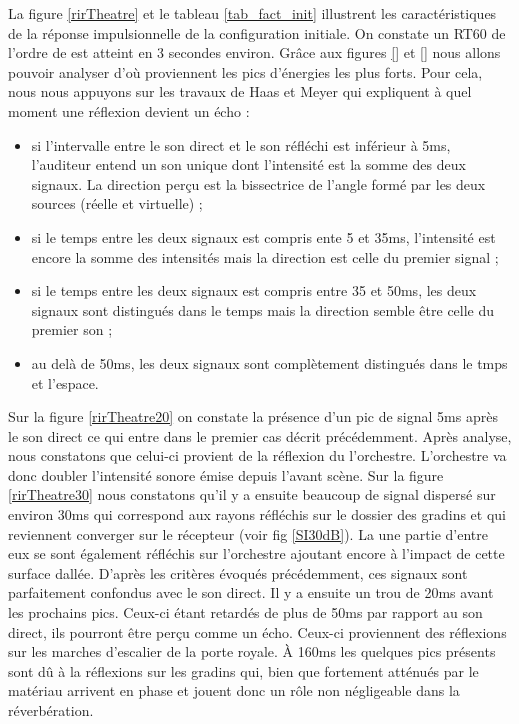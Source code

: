 La figure \ref{rirTheatre} et le tableau \ref{tab_fact_init} illustrent les caractéristiques de  la réponse impulsionnelle de la configuration initiale. On constate un \gls{RT60} de l'ordre de est atteint en 3 secondes environ. Grâce aux figures \ref{} et \ref{} nous allons pouvoir analyser d'où proviennent les pics d'énergies les plus forts. Pour cela, nous nous appuyons sur les travaux de Haas et Meyer \cite[p.49]{haas} qui expliquent à quel moment une réflexion devient un écho :
\begin{itemize}
\item si l'intervalle entre le son direct et le son réfléchi est inférieur à 5ms, l'auditeur entend un son unique dont l'intensité est la somme des deux signaux. La direction perçu est la bissectrice de l'angle formé par les deux sources (réelle et virtuelle) ;
\item si le temps entre les deux signaux est compris ente 5 et 35ms, l'intensité est encore la somme des intensités mais la direction est celle du premier signal ;
\item si le temps entre les deux signaux est compris entre 35 et 50ms, les deux signaux sont distingués dans le temps mais la direction semble être celle du premier son ;
\item au delà de 50ms, les deux signaux sont complètement distingués dans le tmps et l'espace.
\end{itemize}
Sur la figure \ref{rirTheatre20} on constate la présence d'un pic de signal 5ms après le son direct ce qui entre dans le premier cas décrit précédemment. Après analyse, nous constatons que celui-ci provient de la réflexion du l'orchestre. L'orchestre va donc doubler l'intensité sonore émise depuis l'avant scène. Sur la figure \ref{rirTheatre30} nous constatons qu'il y a ensuite beaucoup de signal dispersé sur environ 30ms qui correspond aux rayons réfléchis sur le dossier des gradins et qui reviennent converger sur le récepteur (voir fig \ref{SI30dB}). La une partie d'entre eux se sont également réfléchis sur l'orchestre ajoutant encore à l'impact de cette surface dallée. D'après les critères évoqués précédemment, ces signaux sont parfaitement confondus avec le son direct. Il y a ensuite un trou de 20ms avant les prochains pics. Ceux-ci étant retardés de plus de 50ms par rapport au son direct, ils pourront être perçu comme un écho. Ceux-ci proviennent des réflexions sur les marches d'escalier de la porte royale. À 160ms les quelques pics présents sont dû à la réflexions sur les gradins qui, bien que fortement atténués par le matériau arrivent en phase et jouent donc un rôle non négligeable dans la réverbération.



